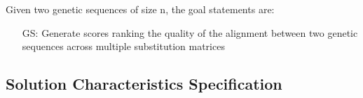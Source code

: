 \documentclass[12pt]{article}
\newcounter{goalnum} %
\begin{document}
\noindent Given two genetic sequences of size n, the goal statements are:

\begin{itemize}

\item[GS\refstepcounter{goalnum}\thegoalnum \label{generate_alignment}:] Generate 
scores ranking the quality of the alignment between two genetic sequences across
multiple substitution matrices

\end{itemize}

\subsection{Solution Characteristics Specification}



\end{document}
